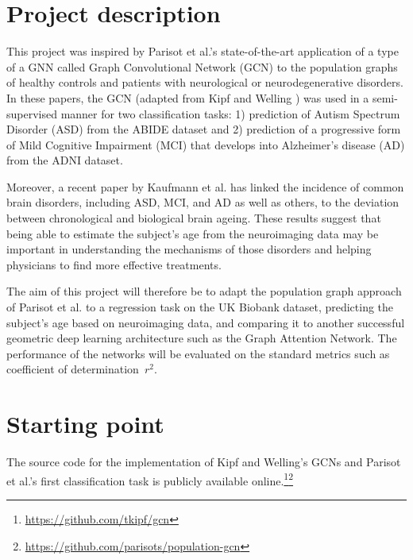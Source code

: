 \documentclass[12pt,a4paper,twoside]{article}
\begin{document}
\section*{Project description}
This project was inspired by Parisot et al.'s \cite{parisot2017spectral, parisot2018disease} state-of-the-art application of a type of a GNN called Graph Convolutional Network (GCN) to the population graphs of healthy controls and patients with neurological or neurodegenerative disorders. In these papers, the GCN (adapted from Kipf and Welling \cite{kipf2017semi}) was used in a semi-supervised manner for two classification tasks: 1) prediction of Autism Spectrum Disorder (ASD) from the ABIDE dataset and 2) prediction of a progressive form of Mild Cognitive Impairment (MCI) that develops into Alzheimer's disease (AD) from the ADNI dataset.

Moreover, a recent paper by Kaufmann et al. \cite{kaufmann2019} has linked the incidence of common brain disorders, including ASD, MCI, and AD as well as others, to the deviation between chronological and biological brain ageing. These results suggest that being able to estimate the subject's age from the neuroimaging data may be important in understanding the mechanisms of those disorders and helping physicians to find more effective treatments.

The aim of this project will therefore be to adapt the population graph approach of Parisot et al. \cite{parisot2017spectral, parisot2018disease} to a regression task on the UK Biobank dataset, predicting the subject's age based on neuroimaging data, and comparing it to another successful geometric deep learning architecture such as the Graph Attention Network. \cite{velickovic2018graph} The performance of the networks will be evaluated on the standard metrics such as coefficient of determination~$r^2$.

\section*{Starting point}

The source code for the implementation of Kipf and Welling's \cite{kipf2017semi} GCNs and Parisot et al.'s \cite{parisot2017spectral, parisot2018disease} first classification task is publicly available online.\footnote{\url{https://github.com/tkipf/gcn}}\footnote{\url{https://github.com/parisots/population-gcn}}
\end{document}
